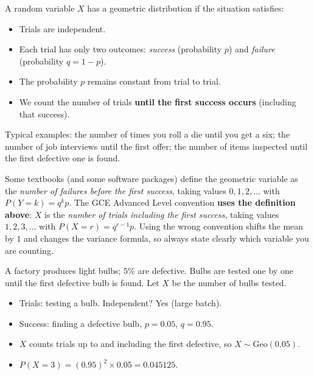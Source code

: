\documentclass[11pt]{article}
\begin{document}
\begin{aretenir}
A random variable $X$ has a geometric distribution if the situation satisfies:
\begin{itemize}
\item Trials are independent.
\item Each trial has only two outcomes: \emph{success} (probability $p$) and \emph{failure} (probability $q=1-p$).
\item The probability $p$ remains constant from trial to trial.
\item We count the number of trials \textbf{until the first success occurs} (including that success).
\end{itemize}
Typical examples: the number of times you roll a die until you get a six; the number of job interviews until the first offer; the number of items inspected until the first defective one is found.
\end{aretenir}

\begin{attention}
Some textbooks (and some software packages) define the geometric variable as the \emph{number of failures before the first success}, taking values $0,1,2,\dots$ with $P(Y=k)=q^k p$. The GCE Advanced Level convention \textbf{uses the definition above}: $X$ is the \emph{number of trials including the first success}, taking values $1,2,3,\dots$ with $P(X=r)=q^{r-1}p$. Using the wrong convention shifts the mean by $1$ and changes the variance formula, so always state clearly which variable you are counting.
\end{attention}

\begin{exemplebox}
A factory produces light bulbs; $5\%$ are defective. Bulbs are tested one by one until the first defective bulb is found. Let $X$ be the number of bulbs tested.
\begin{itemize}
\item Trials: testing a bulb. Independent? Yes (large batch).
\item Success: finding a defective bulb, $p=0.05$, $q=0.95$.
\item $X$ counts trials up to and including the first defective, so $X\sim\mathrm{Geo}(0.05)$.
\item $P(X=3) = (0.95)^2 \times 0.05 = 0.045125$.
\end{itemize}
\end{exemplebox}
\end{document}
